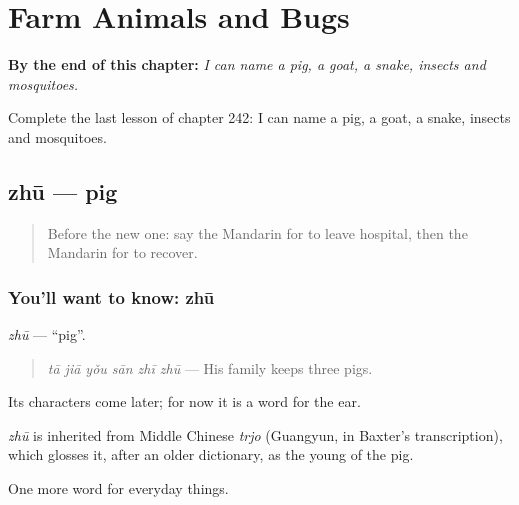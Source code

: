 
\chapter{Farm Animals and Bugs}
\label{ch:zh-farm-animals-and-bugs}

\begin{chapteropening}
\textbf{By the end of this chapter:} \emph{I can name a pig, a goat, a snake, insects and mosquitoes.}

Complete the last lesson of chapter 242: I can name a pig, a goat, a snake, insects and mosquitoes.
\end{chapteropening}

\section[zhū]{zhū — pig}

\label{lesson:ZH-C242-zhu}



\begin{quote}
Before the new one: say the Mandarin for to leave hospital, then the Mandarin for to recover.
\end{quote}

\subsection*{You'll want to know: zhū}
\emph{zhū} — \textquotedblleft{}pig\textquotedblright{}.

\begin{quote}
\emph{tā jiā yǒu sān zhī zhū} — His family keeps three pigs.
\end{quote}

Its characters come later; for now it is a word for the ear.

\begin{cousinweb}
\emph{zhū} is inherited from Middle Chinese \emph{trjo} (Guangyun, in Baxter's transcription), which glosses it, after an older dictionary, as the young of the pig.
\end{cousinweb}

\begin{grammarlens}[title={What you've built}]
One more word for everyday things.
\end{grammarlens}

